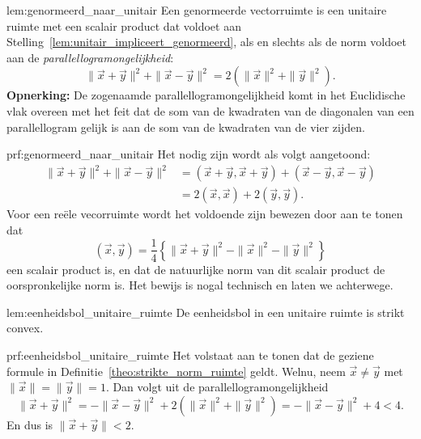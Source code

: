 \begin{lem}{lem:genormeerd_naar_unitair}
    Een genormeerde vectorruimte is een unitaire ruimte met een scalair product dat voldoet aan Stelling~\ref{lem:unitair_impliceert_genormeerd}, als en slechts als de norm voldoet aan de \emph{parallellogramongelijkheid}:
    \begin{equation*}
        \| \vec{x} + \vec{y} \|^2 + \| \vec{x} - \vec{y} \|^2 = 2 \left(\| \vec{x} \|^2 + \| \vec{y} \|^2\right).
    \end{equation*}
    \textbf{Opnerking:} De zogenaamde parallellogramongelijkheid komt in het Euclidische vlak overeen met het feit dat de som van de kwadraten van de diagonalen van een parallellogram gelijk is aan de som van de kwadraten van de vier zijden.
\end{lem}

\begin{prf}{prf:genormeerd_naar_unitair}
    Het nodig zijn wordt als volgt aangetoond:
    \begin{align*}
        \|\vec{x} + \vec{y}\|^2 + \|\vec{x} - \vec{y}\|^2 
            &= (\vec{x} + \vec{y},\vec{x} + \vec{y}) + (\vec{x} - \vec{y},\vec{x} - \vec{y}) \\
            &= 2(\vec{x},\vec{x}) + 2(\vec{y},\vec{y}).
    \end{align*}
    Voor een reële vecorruimte wordt het voldoende zijn bewezen door aan te tonen dat
    \begin{equation*}
        (\vec{x},\vec{y}) = \frac{1}{4}\left\{
            \| \vec{x} + \vec{y} \|^2 - \| \vec{x} \|^2 - \| \vec{y} \|^2
        \right\}
    \end{equation*}
    een scalair product is, en dat de natuurlijke norm van dit scalair product de oorspronkelijke norm is. Het bewijs is nogal technisch en laten we achterwege.
\end{prf}

\begin{lem}{lem:eenheidsbol_unitaire_ruimte}
    De eenheidsbol in een unitaire ruimte is strikt convex.
\end{lem}

\newpage

\begin{prf}{prf:eenheidsbol_unitaire_ruimte}
    Het volstaat aan te tonen dat de geziene formule in Definitie~\ref{theo:strikte_norm_ruimte} geldt. Welnu, neem $\vec{x} \neq \vec{y}$ met $\|\vec{x}\| = \|\vec{y}\| = 1$. Dan volgt uit de parallellogramongelijkheid
    \begin{equation*}
        \| \vec{x} + \vec{y} \|^2 = - \| \vec{x} - \vec{y} \|^2 + 2(\| \vec{x} \|^2 + \| \vec{y}\|^2)= - \| \vec{x} - \vec{y} \|^2 + 4 < 4.
    \end{equation*}
    En dus is $\| \vec{x} + \vec{y} \| < 2$.
\end{prf}

